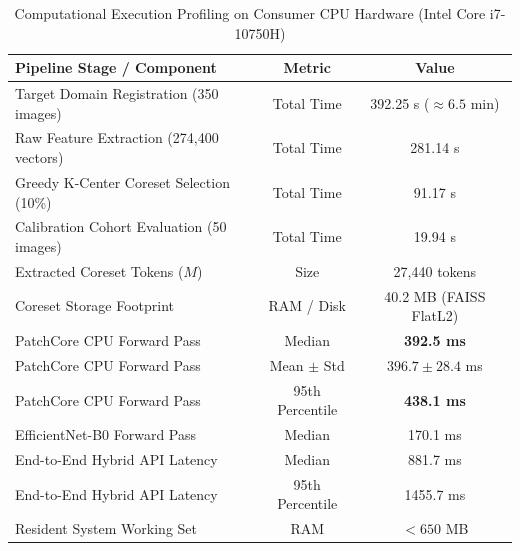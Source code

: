 \begin{table}[t]
\centering
\caption{Computational Execution Profiling on Consumer CPU Hardware (Intel Core i7-10750H)}
\label{tab:cpu_profiling}
\begin{tabular}{lcc}
\toprule
\textbf{Pipeline Stage / Component} & \textbf{Metric} & \textbf{Value} \\
\midrule
Target Domain Registration (350 images) & Total Time & 392.25 s ($\approx 6.5$ min) \\
Raw Feature Extraction (274,400 vectors) & Total Time & 281.14 s \\
Greedy K-Center Coreset Selection (10\%) & Total Time & 91.17 s \\
Calibration Cohort Evaluation (50 images) & Total Time & 19.94 s \\
Extracted Coreset Tokens ($M$) & Size & 27,440 tokens \\
Coreset Storage Footprint & RAM / Disk & 40.2 MB (FAISS FlatL2) \\
\midrule
PatchCore CPU Forward Pass & Median & \textbf{392.5 ms} \\
PatchCore CPU Forward Pass & Mean $\pm$ Std & $396.7 \pm 28.4$ ms \\
PatchCore CPU Forward Pass & 95th Percentile & \textbf{438.1 ms} \\
EfficientNet-B0 Forward Pass & Median & 170.1 ms \\
End-to-End Hybrid API Latency & Median & 881.7 ms \\
End-to-End Hybrid API Latency & 95th Percentile & 1455.7 ms \\
Resident System Working Set & RAM & $< 650$ MB \\
\bottomrule
\end{tabular}
\end{table}
